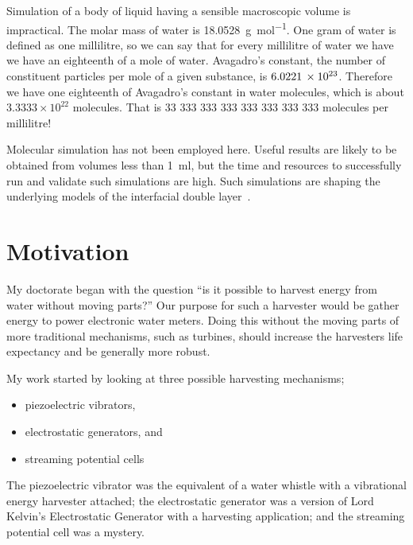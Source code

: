     Simulation of a body of liquid having a sensible macroscopic volume is impractical.
    The molar mass of water is \SI{18.0528}{\gram\per\mole}.
    One gram of water is defined as one millilitre, so we can say that for every millilitre of water we have we have an eighteenth of a mole of water.
    Avagadro's constant, the number of constituent particles per mole of a given substance, is $6.0221\thinspace \times 10^{23}$.
    Therefore we have one eighteenth of Avagadro's constant in water molecules, which is about $3.3333\times 10^{22}$ molecules.
    That is 33 333 333 333 333 333 333 333 molecules per millilitre!

    Molecular simulation has not been employed here.
    Useful results are likely to be obtained from volumes less than \SI{1}{\milli\litre}, but the time and resources to successfully run and validate such simulations are high.
    Such simulations are shaping the underlying models of the interfacial double layer~\cite{Kornyshev2007}.


\section{Motivation}
  My doctorate began with the question ``is it possible to harvest energy from water without moving parts?''
  Our purpose for such a harvester would be gather energy to power electronic water meters.
  Doing this without the moving parts of more traditional mechanisms, such as turbines, should increase the harvesters life expectancy and be generally more robust.

  My work started by looking at three possible harvesting mechanisms;
  \begin{itemize}
    \item piezoelectric vibrators,
    \item electrostatic generators, and
    \item streaming potential cells
  \end{itemize}

  The piezoelectric vibrator was the equivalent of a water whistle with a vibrational energy harvester attached; the electrostatic generator was a version of Lord Kelvin's Electrostatic Generator with a harvesting application; and the streaming potential cell was a mystery.


